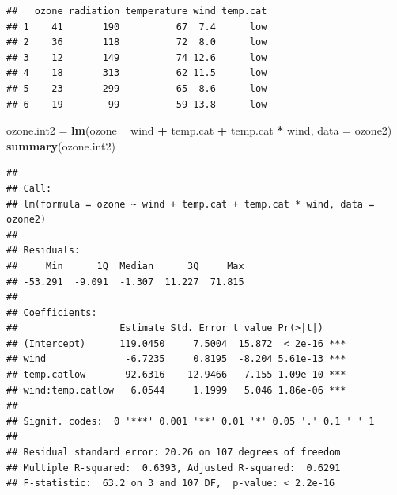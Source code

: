 \documentclass[10pt,ignorenonframetext,]{beamer}
\newenvironment{Shaded}{\begin{snugshade}}{\end{snugshade}}
\newcommand{\KeywordTok}[1]{\textcolor[rgb]{0.13,0.29,0.53}{\textbf{#1}}}
\newcommand{\DataTypeTok}[1]{\textcolor[rgb]{0.13,0.29,0.53}{#1}}
\newcommand{\StringTok}[1]{\textcolor[rgb]{0.31,0.60,0.02}{#1}}
\newcommand{\OperatorTok}[1]{\textcolor[rgb]{0.81,0.36,0.00}{\textbf{#1}}}
\newcommand{\NormalTok}[1]{#1}
\begin{document}
\begin{frame}[fragile]

\footnotesize

\begin{Shaded}
\end{Shaded}

\begin{verbatim}
##   ozone radiation temperature wind temp.cat
## 1    41       190          67  7.4      low
## 2    36       118          72  8.0      low
## 3    12       149          74 12.6      low
## 4    18       313          62 11.5      low
## 5    23       299          65  8.6      low
## 6    19        99          59 13.8      low
\end{verbatim}

\begin{Shaded}
\begin{Highlighting}[]
\NormalTok{ozone.int2 =}\StringTok{ }\KeywordTok{lm}\NormalTok{(ozone }\OperatorTok{~}\StringTok{ }\NormalTok{wind }\OperatorTok{+}\StringTok{ }\NormalTok{temp.cat }\OperatorTok{+}\StringTok{ }\NormalTok{temp.cat }\OperatorTok{*}\StringTok{ }\NormalTok{wind, }\DataTypeTok{data =}\NormalTok{ ozone2)}
\KeywordTok{summary}\NormalTok{(ozone.int2)}
\end{Highlighting}
\end{Shaded}

\begin{verbatim}
## 
## Call:
## lm(formula = ozone ~ wind + temp.cat + temp.cat * wind, data = ozone2)
## 
## Residuals:
##     Min      1Q  Median      3Q     Max 
## -53.291  -9.091  -1.307  11.227  71.815 
## 
## Coefficients:
##                  Estimate Std. Error t value Pr(>|t|)    
## (Intercept)      119.0450     7.5004  15.872  < 2e-16 ***
## wind              -6.7235     0.8195  -8.204 5.61e-13 ***
## temp.catlow      -92.6316    12.9466  -7.155 1.09e-10 ***
## wind:temp.catlow   6.0544     1.1999   5.046 1.86e-06 ***
## ---
## Signif. codes:  0 '***' 0.001 '**' 0.01 '*' 0.05 '.' 0.1 ' ' 1
## 
## Residual standard error: 20.26 on 107 degrees of freedom
## Multiple R-squared:  0.6393, Adjusted R-squared:  0.6291 
## F-statistic:  63.2 on 3 and 107 DF,  p-value: < 2.2e-16
\end{verbatim}

\normalsize

\end{frame}
\end{document}
